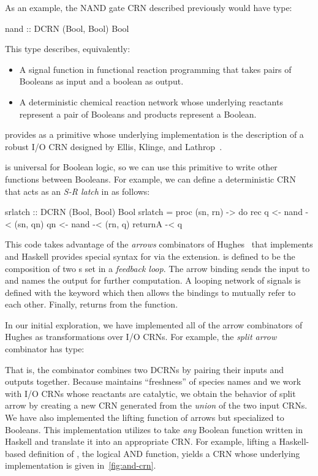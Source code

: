 As an example, the NAND gate CRN described previously would have type:
\begin{haskellcode}
nand :: DCRN (Bool, Bool) Bool
\end{haskellcode}
This type describes, equivalently:
\begin{itemize}[itemsep=0pt]
  \item A signal function in functional reaction programming that takes pairs of Booleans as input and a boolean as output.
  \item A deterministic chemical reaction network whose underlying reactants represent a pair of Booleans and products represent a Boolean.
\end{itemize}
\reactamole{} provides  as a primitive whose underlying implementation is the description of a robust  I/O CRN designed by Ellis, Klinge, and Lathrop~\cite{rdc}.

 is universal for Boolean logic, so we can use this primitive to write other functions between Booleans.
For example, we can define a deterministic CRN that acts as an \emph{S-R latch} in \reactamole{} as follows:
\begin{haskellcode}
srlatch :: DCRN (Bool, Bool) Bool
srlatch = proc (sn, rn) -> do
    rec q  <- nand -< (sn, qn)
        qn <- nand -< (rn, q)
    returnA -< q
\end{haskellcode}
This code takes advantage of the \emph{arrows} combinators of Hughes~\cite{hughes:2000:arrows} that \reactamole{} implements and Haskell provides special syntax for via the  extension.
 is defined to be the composition of two s set in a \emph{feedback loop}.
The arrow binding  sends the input  to  and names the output  for further computation.
A looping network of signals is defined with the  keyword which then allows the bindings to mutually refer to each other.
Finally,  returns  from the function.

In our initial exploration, we have implemented all of the arrow combinators of Hughes as transformations over I/O CRNs.
For example, the \emph{split arrow} combinator has type:
That is, the combinator combines two DCRNs by pairing their inputs and outputs together.
Because \reactamole{} maintains ``freshness'' of species names and we work with I/O CRNs whose reactants are catalytic, we obtain the behavior of split arrow by creating a new CRN generated from the \emph{union} of the two input CRNs.
We have also implemented the lifting function of arrows  but specialized to Booleans.
This implementation utilizes  to take \emph{any} Boolean function written in Haskell and translate it into an appropriate CRN.
For example, lifting a Haskell-based definition of \hask{&&}, the logical AND function,  yields a CRN whose underlying \reactamole{} implementation is given in~\autoref{fig:and-crn}.

